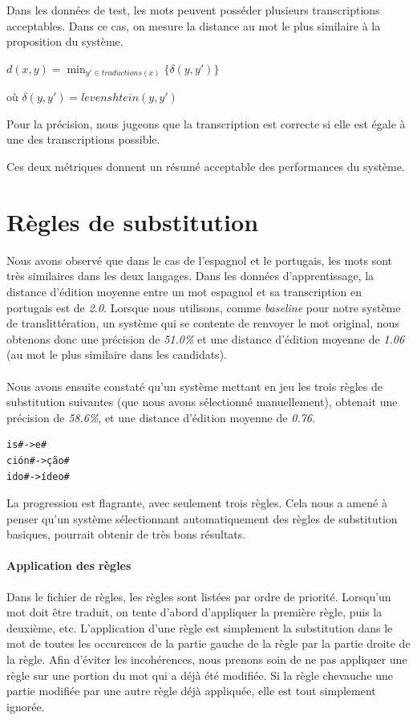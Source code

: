 \documentclass{article}
\begin{document}
Dans les données de test, les mots peuvent posséder plusieurs transcriptions acceptables. Dans ce cas, on mesure la distance au mot le plus similaire à la proposition du système.

$d(x,y) = \min_{y' \in traductions(x)} \{\delta(y,y')\}$

où $\delta(y,y')=levenshtein(y,y')$

Pour la précision, nous jugeons que la transcription est correcte si elle est égale à une des transcriptions possible.

Ces deux métriques donnent un résumé acceptable des performances du système.

\section{Règles de substitution}
Nous avons observé que dans le cas de l'espagnol et le portugais, les mots sont très similaires dans les deux langages. Dans les données d'apprentissage, la distance d'édition moyenne entre un mot espagnol et sa transcription en portugais est de \emph{2.0}.
Lorsque nous utilisons, comme \emph{baseline} pour notre système de translittération, un système qui se contente de renvoyer le mot original, nous obtenons donc une précision de \emph{51.0\%} et une distance d'édition moyenne de \emph{1.06} (au mot le plus similaire dans les candidats).

\paragraph{}
Nous avons ensuite constaté qu'un système mettant en jeu les trois règles de substitution suivantes (que nous avons sélectionné manuellement), obtenait une précision de \emph{58.6\%}, et une distance d'édition moyenne de \emph{0.76}.
\begin{verbatim}
is#->e#
ción#->ção#
ido#->ídeo#
\end{verbatim}
La progression est flagrante, avec seulement trois règles. Cela nous a amené à penser qu'un système sélectionnant automatiquement des règles de substitution basiques, pourrait obtenir de très bons résultats.

\paragraph{Application des règles}
Dans le fichier de règles, les règles sont listées par ordre de priorité. Lorsqu'un mot doit être traduit, on tente d'abord d'appliquer la première règle, puis la deuxième, etc.  L'application d'une règle est simplement la substitution dans le mot de toutes les occurences de la partie gauche de la règle par la partie droite de la règle. Afin d'éviter les incohérences, nous prenons soin de ne pas appliquer une règle sur une portion du mot qui a déjà été modifiée. Si la règle chevauche une partie modifiée par une autre règle déjà appliquée, elle est tout simplement ignorée.
\end{document}
